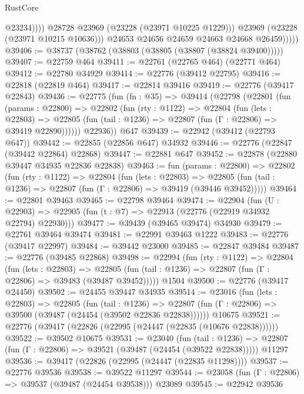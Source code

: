 \begin{lexlean}{RustCore}
\begin{coremodule}
                          @23234))))
                  @28728
                  @23969
                  (@23228 (@23971 @10225 @1229)))
                @23969
                (@23228 (@23971 @10215 @10636)))
              @24653
              @24656
              @24659
              @24663
              @24668
              @26459)))))
@39406 := @38737 (@38762 (@38803 (@38805 (@38807 (@38824 @39400)))))
@39407 := @22759 @464
@39411 := @22761 (@22765 @464) (@22771 @464)
@39412 := @22780 @34929
@39414 := @22776 (@39412 @22795)
@39416 := @22818 (@22819 @464)
@39417 := @22814 @39416
@39419 := @22776 (@39417 @22843)
@39436 := @22775
    (fun (fn : @35) =>
    @39414
      (@22798
        (@22801
          (fun (params : @22800) =>
          @22802
            (fun (rty : @1122) =>
            @22804
              (fun (lets : @22803) =>
              @22805 (fun (tail : @1236) => @22807 (fun (Γ : @22806) => @39419 @22890))))))
        @22936))
    @647
@39439 := @22942 (@39412 (@22793 @647))
@39442 := @22855 (@22856 @647) @34932
@39446 := @22776 (@22847 (@39442 @22864) @22868)
@39447 := @22881 @647
@39452 := @22878 (@22880 @39447 @34935 @22836 @22838)
@39463 := fun (params : @22800) =>
  @22802
    (fun (rty : @1122) =>
    @22804
      (fun (lets : @22803) =>
      @22805 (fun (tail : @1236) => @22807 (fun (Γ : @22806) => @39419 (@39446 @39452)))))
@39464 := @22801 @39463
@39465 := @22798 @39464
@39474 := @22904
    (fun (U : @22903) => @22905 (fun (t : @7) => @22913 (@22776 (@22919 @34932 @22794) @22930)))
@39477 := @39439 (@39465 @39474) @34930
@39479 := @22761 @39464 @39474
@39481 := @22991 @39463 @1222
@39483 := @22776 (@39417 @22997)
@39484 := @39442 @23000
@39485 := @22847 @39484
@39487 := @22776 (@39485 @22868)
@39498 := @22994
    (fun (rty : @1122) =>
    @22804
      (fun (lets : @22803) =>
      @22805 (fun (tail : @1236) => @22807 (fun (Γ : @22806) => @39483 (@39487 @39452)))))
    @1504
@39500 := @22776 (@39417 @24450)
@39502 := @24455 @39447 @34935
@39514 := @23016
    (fun (lets : @22803) =>
    @22805
      (fun (tail : @1236) =>
      @22807 (fun (Γ : @22806) => @39500 (@39487 (@24454 (@39502 @22836 @22838))))))
    @10675
@39521 := @22776 (@39417 (@22826 (@22995 (@24447 (@22835 (@10676 @22838))))))
@39522 := @39502 @10675
@39531 := @23040
    (fun (tail : @1236) => @22807 (fun (Γ : @22806) => @39521 (@39487 (@24454 (@39522 @22838)))))
    @11297
@39536 := @39417 (@22826 (@22995 (@24447 (@22835 @11298))))
@39537 := @22776 @39536
@39538 := @39522 @11297
@39544 := @23058 (fun (Γ : @22806) => @39537 (@39487 (@24454 @39538))) @23089
@39545 := @22942 @39536

\end{coremodule}
\end{lexlean}
